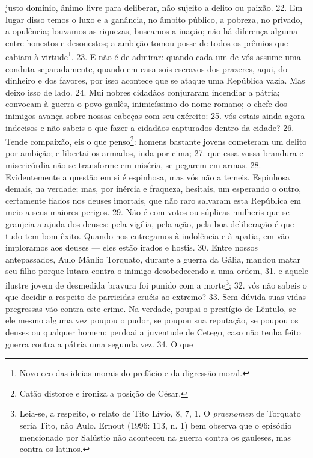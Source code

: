 justo domínio, ânimo livre para deliberar, não sujeito a delito ou paixão. 22.
Em lugar disso temos o luxo e a ganância, no âmbito público, a pobreza, no
privado, a opulência; louvamos as riquezas, buscamos a inação; não há diferença
alguma entre honestos e desonestos; a ambição tomou posse de todos os prêmios
que cabiam à virtude\footnote{Novo eco das ideias morais do prefácio  e da
digressão moral.}. 23. E não é de admirar: quando cada um de vós assume uma
conduta separadamente, quando em casa sois escravos dos prazeres, aqui, do
dinheiro e dos favores, por isso acontece que se ataque uma República vazia.
Mas deixo isso de lado. 24. Mui nobres cidadãos conjuraram incendiar a pátria;
convocam à guerra o povo gaulês, inimicíssimo do nome romano; o chefe dos
inimigos avança sobre nossas cabeças com seu exército: 25. vós estais ainda
agora indecisos e não sabeis o que fazer a cidadãos capturados dentro da
cidade? 26. Tende compaixão, eis o que penso\footnote{Catão distorce e ironiza
a posição de César.}: homens bastante jovens cometeram um delito por ambição; e
libertai-os armados, inda por cima; 27. que essa vossa brandura e misericórdia
não se transforme em miséria, se pegarem em armas. 28. Evidentemente a questão
em si é espinhosa, mas vós não a temeis. Espinhosa demais, na verdade; mas, por
inércia e fraqueza, hesitais, um esperando o outro, certamente fiados
nos deuses imortais, que não raro salvaram esta República em meio a seus
maiores perigos. 29. Não é com votos ou súplicas mulheris que se granjeia a
ajuda dos deuses: pela vigília, pela ação, pela boa deliberação é que tudo tem
bom êxito. Quando nos entregamos à indolência e à apatia, em vão imploramos aos
deuses --- eles estão irados e hostis. 30. Entre nossos antepassados, Aulo
Mânlio Torquato, durante a guerra da Gália, mandou matar seu filho porque
lutara contra o inimigo desobedecendo a uma ordem, 31. e aquele ilustre jovem
de desmedida bravura foi punido com a morte\footnote{Leia-se, a respeito, o
relato de Tito Lívio, 8, 7, 1. O \emph{praenomen} de Torquato seria Tito, não
Aulo. Ernout (1996: 113, n. 1) bem observa que o episódio mencionado por
Salústio não aconteceu na guerra contra os gauleses, mas contra os latinos.};
32. vós não sabeis o que decidir a respeito de parricidas cruéis ao extremo?
33. Sem dúvida suas vidas pregressas vão contra este crime. Na verdade, poupai
o prestígio de Lêntulo, se ele mesmo alguma vez poupou o pudor, se poupou sua
reputação, se poupou os deuses ou qualquer homem; perdoai a juventude de
Cetego, caso não tenha feito guerra contra a pátria uma segunda vez. 34. O que
